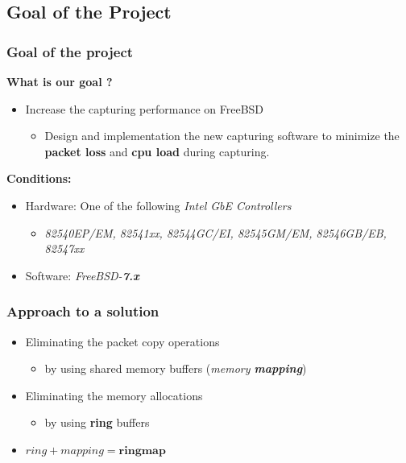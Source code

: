 \documentclass{beamer}
\begin{document}
\subsection*{Goal of the Project}
\begin{frame}
\frametitle{Goal of the project}
\textbf{What is our goal ?}
\begin{itemize}
	\item Increase the capturing performance on FreeBSD
		\begin{itemize}
			\item Design and implementation the new capturing software to
				minimize the \textbf{packet loss} and \textbf{cpu load} during capturing. \newline \newline
		\end{itemize}
\end{itemize}
\textbf{Conditions:}
\begin{itemize}
	\item Hardware: One of the following \emph{Intel GbE Controllers}
		\begin{itemize}
			\item \small{\emph{82540EP/EM, 82541xx, 82544GC/EI, 82545GM/EM, 82546GB/EB, 82547xx}}
		\end{itemize}
	\item Software:	\emph{FreeBSD-\textbf{7.x}}
\end{itemize}
\end{frame}

\begin{frame}
\frametitle{Approach to a solution}
\begin{itemize}
	\item Eliminating the packet copy operations
		\begin{itemize}
			\item by using shared memory buffers (\emph{memory \textbf{mapping}})\newline
		\end{itemize}
	\item Eliminating the memory allocations
		\begin{itemize}
			\item by using \textbf{ring} buffers\newline \newline
		\end{itemize}
	\item<2->[$\Rightarrow$] $ring + mapping = \textbf{ringmap}$
\end{itemize}
\end{frame}
\end{document}
